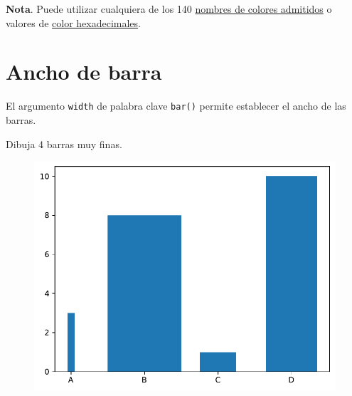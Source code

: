 \textbf{Nota}. Puede utilizar cualquiera de los 140 \href{https://www.w3schools.com/colors/colors_names.asp}{nombres de
colores admitidos} o valores de \href{https://www.w3schools.com/colors/colors_hexadecimal.asp}{color hexadecimales}.

\section{Ancho de barra}

El argumento \texttt{width} de palabra clave \texttt{bar()} permite
establecer el ancho de las barras. \\

\begin{code} Dibuja 4 barras muy finas.

\begin{Shaded}
\begin{Highlighting}[]

\OperatorTok{=}\NormalTok{ np.array([}\NormalTok{, }\NormalTok{, }\NormalTok{, }\NormalTok{])}
\OperatorTok{=}\NormalTok{ np.array([}\NormalTok{, }\NormalTok{, }\NormalTok{, }\NormalTok{])}
\OperatorTok{=}\NormalTok{ np.array([}\NormalTok{, }\NormalTok{, }\NormalTok{, }\NormalTok{])}

\OperatorTok{=}
\end{Highlighting}
\end{Shaded}

\begin{figure}
  \centering
  \includegraphics[scale=0.6]{img/grafica1048.pdf}
\end{figure}
\end{code}

